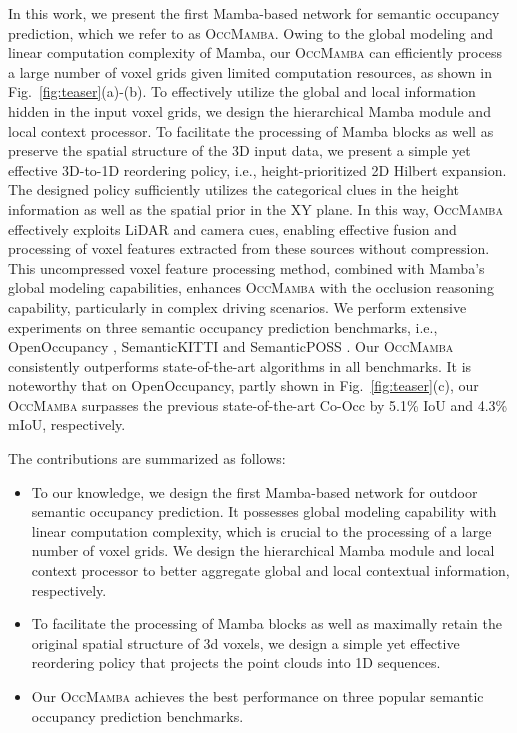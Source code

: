 \documentclass[10pt,twocolumn,letterpaper]{article}
\newcommand{\methodname}{\textsc{OccMamba}}
\begin{document}
In this work, we present the first Mamba-based network for semantic occupancy prediction, which we refer to as \methodname{}. Owing to the global modeling and linear computation complexity of Mamba, our \methodname{} can efficiently process a large number of voxel grids given limited computation resources, as shown in Fig.~\ref{fig:teaser}(a)-(b). To effectively utilize the global and local information hidden in the input voxel grids, we design the hierarchical Mamba module and local context processor. To facilitate the processing of Mamba blocks as well as preserve the spatial structure of the 3D input data, we present a simple yet effective 3D-to-1D reordering policy, i.e., height-prioritized 2D Hilbert expansion. The designed policy sufficiently utilizes the categorical clues in the height information as well as the spatial prior in the XY plane. In this way, \methodname{} effectively exploits LiDAR and camera cues, enabling effective fusion and processing of voxel features extracted from these sources without compression. This uncompressed voxel feature processing method, combined with Mamba's global modeling capabilities, enhances \methodname{} with the occlusion reasoning capability, particularly in complex driving scenarios. We perform extensive experiments on three semantic occupancy prediction benchmarks, i.e., OpenOccupancy \cite{luisroldao}, SemanticKITTI \cite{jensbehley} and SemanticPOSS \cite{sourabhvora}. Our \methodname{} consistently outperforms state-of-the-art algorithms in all benchmarks. It is noteworthy that on OpenOccupancy, partly shown in Fig.~\ref{fig:teaser}(c), our \methodname{} surpasses the previous state-of-the-art Co-Occ \cite{jianbiaomei} by 5.1\% IoU and 4.3\% mIoU, respectively.

The contributions are summarized as follows:
\begin{itemize}
  \item To our knowledge, we design the first Mamba-based network for outdoor semantic occupancy prediction. It possesses global modeling capability with linear computation complexity, which is crucial to the processing of a large number of voxel grids. We design the hierarchical Mamba module and local context processor to better aggregate global and local contextual information, respectively.
  \item To facilitate the processing of Mamba blocks as well as maximally retain the original spatial structure of 3d voxels, we design a simple yet effective reordering policy that projects the point clouds into 1D sequences.
  \item Our \methodname{} achieves the best performance on three popular semantic occupancy prediction benchmarks.
\end{itemize}
\end{document}
